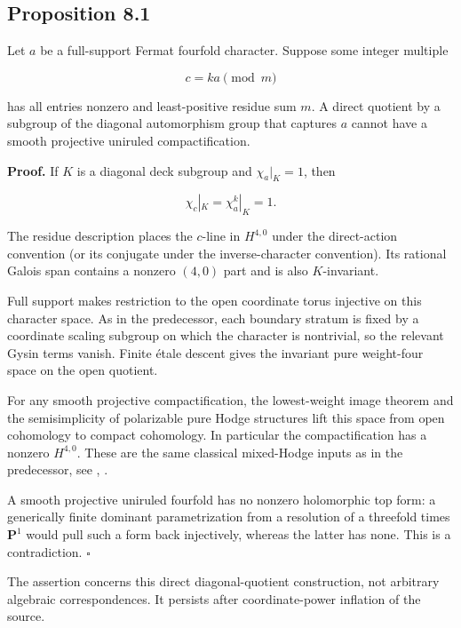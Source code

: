 \hypertarget{transfer210-proposition-8.1}{%
\subsection{Proposition 8.1}\label{transfer210-proposition-8.1}}

Let \(a\) be a full-support Fermat fourfold character. Suppose some
integer multiple

\[
c=ka\pmod m
\]

has all entries nonzero and least-positive residue sum \(m\). A direct
quotient by a subgroup of the diagonal automorphism group that captures
\(a\) cannot have a smooth projective uniruled compactification.

\textbf{Proof.} If \(K\) is a diagonal deck subgroup and
\(\chi_a|_K=1\), then

\[
\chi_c|_K=\chi_a^k|_K=1.
\]

The residue description places the \(c\)-line in \(H^{4,0}\) under the
direct-action convention (or its conjugate under the inverse-character
convention). Its rational Galois span contains a nonzero \((4,0)\) part
and is also \(K\)-invariant.

Full support makes restriction to the open coordinate torus injective on
this character space. As in the predecessor, each boundary stratum is
fixed by a coordinate scaling subgroup on which the character is
nontrivial, so the relevant Gysin terms vanish. Finite étale descent
gives the invariant pure weight-four space on the open quotient.

For any smooth projective compactification, the lowest-weight image
theorem and the semisimplicity of polarizable pure Hodge structures lift
this space from open cohomology to compact cohomology. In particular the
compactification has a nonzero \(H^{4,0}\). These are the same classical
mixed-Hodge inputs as in the predecessor, see \cite{ArapuraUniruled},
\cite{DeligneHodgeII}.

A smooth projective uniruled fourfold has no nonzero holomorphic top
form: a generically finite dominant parametrization from a resolution of
a threefold times \(\mathbf P^1\) would pull such a form back
injectively, whereas the latter has none. This is a contradiction. \hfill\ensuremath{\square}

The assertion concerns this direct diagonal-quotient construction, not
arbitrary algebraic correspondences. It persists after coordinate-power
inflation of the source.


